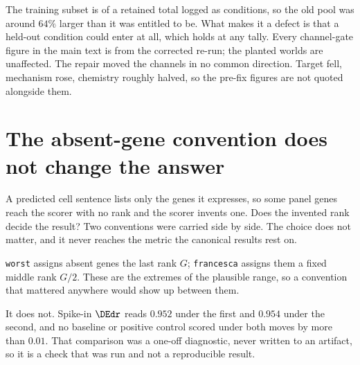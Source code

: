 The training subset is
 of a retained total logged as
 conditions, so the old
pool was around $64\%$ larger than it was entitled to be. What makes it a defect
is that a held-out condition could enter at all, which holds at any tally. Every
channel-gate figure in the main text is from the corrected
re-run; the planted worlds are unaffected. The
repair moved the channels in no common direction. Target fell, mechanism rose,
chemistry roughly halved, so the pre-fix figures are not quoted alongside them.

%
\section{The absent-gene convention does not change the answer}
\label{sec:app-convention}

\begin{question}
A predicted cell sentence lists only the genes it expresses, so some panel genes
reach the scorer with no rank and the scorer invents one. Does the invented rank
decide the result? Two conventions were carried side by side. The choice does
not matter, and it never reaches the metric the canonical results rest on.
\end{question}

\noindent
\texttt{worst} assigns absent genes the last rank $G$; \texttt{francesca}
assigns them a fixed middle rank $G/2$. These are the extremes of the plausible
range, so a convention that mattered anywhere would show up between them.

It does not. Spike-in $\DEdr$ reads $0.952$ under the first and $0.954$ under
the second, and no baseline or positive control scored under both moves by more
than $0.01$. That comparison was a one-off diagnostic, never written to an
artifact, so it is a check that was run and not a reproducible result.

